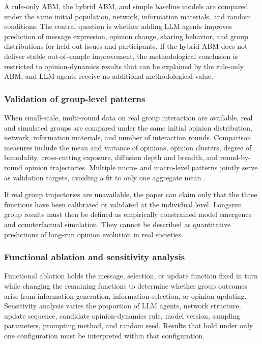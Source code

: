 \documentclass[11pt,a4paper]{article}
\begin{document}
A rule-only ABM, the hybrid ABM, and simple baseline models are compared under the same initial population, network, information materials, and random conditions. The central question is whether adding LLM agents improves prediction of message expression, opinion change, sharing behavior, and group distributions for held-out issues and participants. If the hybrid ABM does not deliver stable out-of-sample improvement, the methodological conclusion is restricted to opinion-dynamics results that can be explained by the rule-only ABM, and LLM agents receive no additional methodological value.

\subsubsection{Validation of group-level patterns}

When small-scale, multi-round data on real group interaction are available, real and simulated groups are compared under the same initial opinion distribution, network, information materials, and number of interaction rounds. Comparison measures include the mean and variance of opinions, opinion clusters, degree of bimodality, cross-cutting exposure, diffusion depth and breadth, and round-by-round opinion trajectories. Multiple micro- and macro-level patterns jointly serve as validation targets, avoiding a fit to only one aggregate mean \cite{grimm2005}.

If real group trajectories are unavailable, the paper can claim only that the three functions have been calibrated or validated at the individual level. Long-run group results must then be defined as empirically constrained model emergence and counterfactual simulation. They cannot be described as quantitative predictions of long-run opinion evolution in real societies.

\subsubsection{Functional ablation and sensitivity analysis}

Functional ablation holds the message, selection, or update function fixed in turn while changing the remaining functions to determine whether group outcomes arise from information generation, information selection, or opinion updating. Sensitivity analysis varies the proportion of LLM agents, network structure, update sequence, candidate opinion-dynamics rule, model version, sampling parameters, prompting method, and random seed. Results that hold under only one configuration must be interpreted within that configuration.
\end{document}
